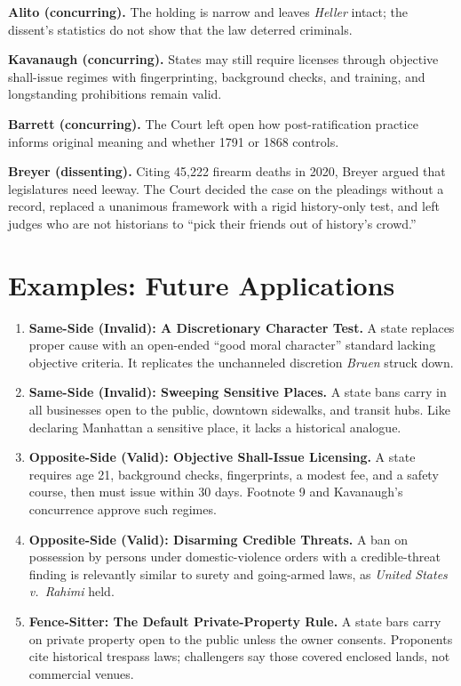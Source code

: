 \documentclass[12pt]{article}
\begin{document}
\textbf{Alito (concurring).} The holding is narrow and leaves \textit{Heller} intact; the dissent's statistics do not show that the law deterred criminals.

\textbf{Kavanaugh (concurring).} States may still require licenses through objective shall-issue regimes with fingerprinting, background checks, and training, and longstanding prohibitions remain valid.

\textbf{Barrett (concurring).} The Court left open how post-ratification practice informs original meaning and whether 1791 or 1868 controls.

\textbf{Breyer (dissenting).} Citing 45,222 firearm deaths in 2020, Breyer argued that legislatures need leeway. The Court decided the case on the pleadings without a record, replaced a unanimous framework with a rigid history-only test, and left judges who are not historians to ``pick their friends out of history's crowd.''

\section{Examples: Future Applications}

\begin{enumerate}
\item \textbf{Same-Side (Invalid): A Discretionary Character Test.} A state replaces proper cause with an open-ended ``good moral character'' standard lacking objective criteria. It replicates the unchanneled discretion \textit{Bruen} struck down.
\item \textbf{Same-Side (Invalid): Sweeping Sensitive Places.} A state bans carry in all businesses open to the public, downtown sidewalks, and transit hubs. Like declaring Manhattan a sensitive place, it lacks a historical analogue.
\item \textbf{Opposite-Side (Valid): Objective Shall-Issue Licensing.} A state requires age 21, background checks, fingerprints, a modest fee, and a safety course, then must issue within 30 days. Footnote 9 and Kavanaugh's concurrence approve such regimes.
\item \textbf{Opposite-Side (Valid): Disarming Credible Threats.} A ban on possession by persons under domestic-violence orders with a credible-threat finding is relevantly similar to surety and going-armed laws, as \textit{United States v.\ Rahimi} held.
\item \textbf{Fence-Sitter: The Default Private-Property Rule.} A state bars carry on private property open to the public unless the owner consents. Proponents cite historical trespass laws; challengers say those covered enclosed lands, not commercial venues.
\end{enumerate}
\end{document}
